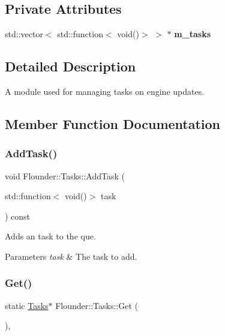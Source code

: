 \subsection*{Private Attributes}
\begin{DoxyCompactItemize}
\item 
\mbox{\label{class_flounder_1_1_tasks_ac4c6115735244d1f27c57cdbc4448567}} 
std\+::vector$<$ std\+::function$<$ void()$>$ $>$ $\ast$ {\bfseries m\+\_\+tasks}
\end{DoxyCompactItemize}


\subsection{Detailed Description}
A module used for managing tasks on engine updates. 



\subsection{Member Function Documentation}
\mbox{\label{class_flounder_1_1_tasks_aa646e9127b0a819d7e71d41cf8b82a96}} 
\subsubsection{\texorpdfstring{Add\+Task()}{AddTask()}}
{\footnotesize\ttfamily void Flounder\+::\+Tasks\+::\+Add\+Task (\begin{DoxyParamCaption}\item[{std\+::function$<$ void()$>$}]{task }\end{DoxyParamCaption}) const}



Adds an task to the que. 


\begin{DoxyParams}{Parameters}
{\em task} & The task to add. \\
\hline
\end{DoxyParams}
\mbox{\label{class_flounder_1_1_tasks_aebcf542cd24e33bff63fd610961d341f}} 
\subsubsection{\texorpdfstring{Get()}{Get()}}
{\footnotesize\ttfamily static \hyperlink{class_flounder_1_1_tasks}{Tasks}$\ast$ Flounder\+::\+Tasks\+::\+Get (\begin{DoxyParamCaption}{ }\end{DoxyParamCaption})\hspace{0.3cm}{\ttfamily [inline]}, {\ttfamily [static]}}



